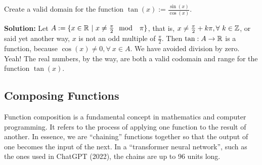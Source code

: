 
\begin{example} Create a valid domain for the function $\tan(x):=\frac{\sin(x)}{\cos(x)}$.
    
\end{example}

\textbf{Solution:}  Let $A:=\{ x\in \mathbb R~|~ x \neq \frac{\pi}{2} \mod~~\pi\}$, that is, $x \neq \frac{\pi}{2} + k \pi, \forall~ k \in \mathbb Z$, or said yet another way, $x$ is not an odd multiple of $\frac{\pi}{2}$. Then $\tan: A \to \mathbb R$ is a function, because $\cos(x) \neq 0, \forall~x\in A$. We have avoided division by zero. Yeah!  The real numbers, by the way, are both a valid codomain and range for the function $\tan(x)$.
\Qed

\bigskip


\bigskip

\subsection{Composing Functions}

Function composition is a fundamental concept in mathematics and computer programming. It refers to the process of applying one function to the result of another. In essence, we are ``chaining'' functions together so that the output of one becomes the input of the next. In a ``transformer neural network'', such as the ones used in ChatGPT (2022), the chains are up to 96 units long. 

\bigskip

